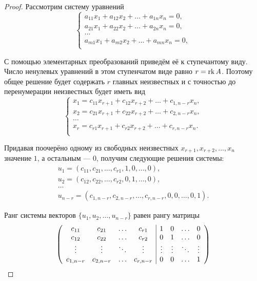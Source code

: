 \begin{proof}
    Рассмотрим систему уравнений
    $$
    \begin{cases}
        a_{11}x_1 + a_{12}x_2 + \ldots + a_{1n}x_n = 0,\\
        a_{21}x_1 + a_{22}x_2 + \ldots + a_{2n}x_n = 0,\\
        \ldots\\
        a_{m1}x_1 + a_{m2}x_2 + \ldots + a_{mn}x_n = 0,\\
    \end{cases}
    $$

    С помощью элементарных преобразований приведём её к ступечантому виду. Число ненулевых уравнений в этом ступенчатом виде равно $r = \mathrm{rk}\, A$. Поэтому общее решение будет содержать $r$ главных неизвестных и с точностью до перенумерации неизвестных будет иметь вид
    $$
    \begin{cases}
        x_1 = c_{11}x_{r + 1} + c_{12}x_{r + 2} + \ldots + c_{1, n - r}x_n,\\
        x_2 = c_{21}x_{r + 1} + c_{22}x_{r + 2} + \ldots + c_{2, n - r}x_n,\\
        \ldots\\
        x_r = c_{r1}x_{r + 1} + c_{r2}x_{r + 2} + \ldots + c_{r, n - r}x_n.\\
    \end{cases}
    $$

    Придавая поочерёно одному из свободных неизвестных $x_{r + 1}, x_{r + 2}, \ldots, x_n$ значение $1$, а остальным --- $0$, получим следующие решения системы:
    $$
    \begin{array}{l}
        u_1 = (c_{11}, c_{21}, \ldots, c_{r1}, 1, 0, \ldots, 0),\\
        u_2 = (c_{12}, c_{22}, \ldots, c_{r2}, 0, 1, \ldots, 0),\\
        \ldots\\
        u_{n - r} = (c_{1, n - r}, c_{2, n - r}, \ldots, c_{r, n - r}, 0, 0, \ldots, 0, 1).
    \end{array}
    $$

    Ранг системы векторов $\{u_1, u_2, \ldots, u_{n - r}\}$ равен рангу матрицы
    $$
    \left(
    \begin{array}{cccc | cccc}
        c_{11} & c_{21} & \ldots & c_{r1} & 1 & 0 & \ldots & 0\\
        c_{12} & c_{22} & \ldots & c_{r2} & 0 & 1 & \ldots & 0\\
        \vdots & \vdots & \ddots & \vdots & \vdots & \vdots & \ddots & \vdots\\
        c_{1, n - r} & c_{2, n - r} & \ldots & c_{r, n - r} & 0 & 0 & \ldots & 1
    \end{array}
    \right)
    $$


\end{proof}
